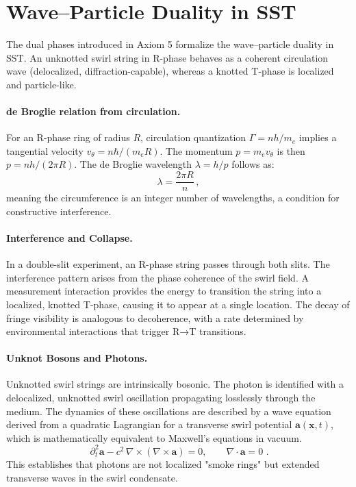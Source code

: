 \documentclass[11pt]{article}
\begin{document}
\section{Wave–Particle Duality in SST}
\label{sec:wave_particle_duality}
The dual phases introduced in Axiom 5 formalize the wave–particle duality in SST. An unknotted swirl string in R-phase behaves as a coherent circulation wave (delocalized, diffraction-capable), whereas a knotted T-phase is localized and particle-like.

\paragraph{de Broglie relation from circulation.}
    For an R-phase ring of radius $R$, circulation quantization $\Gamma = n h/m_e$ implies a tangential velocity $v_\theta = n \hbar/(m_e R)$. The momentum $p = m_e v_\theta$ is then $p = n h / (2\pi R)$. The de Broglie wavelength $\lambda = h/p$ follows as:
    \[ \lambda = \frac{2\pi R}{n}\,, \]
    meaning the circumference is an integer number of wavelengths, a condition for constructive interference.

\paragraph{Interference and Collapse.}
    In a double-slit experiment, an R-phase string passes through both slits. The interference pattern arises from the phase coherence of the swirl field. A measurement interaction provides the energy to transition the string into a localized, knotted T-phase, causing it to appear at a single location. The decay of fringe visibility is analogous to decoherence, with a rate determined by environmental interactions that trigger R→T transitions.

\paragraph{Unknot Bosons and Photons.}
    Unknotted swirl strings are intrinsically bosonic. The photon is identified with a delocalized, unknotted swirl oscillation propagating losslessly through the medium. The dynamics of these oscillations are described by a wave equation derived from a quadratic Lagrangian for a transverse swirl potential $\mathbf{a}(\mathbf{x}, t)$, which is mathematically equivalent to Maxwell's equations in vacuum.
    \[ \boxed{\,\partial_t^2 \mathbf{a} - c^2\,\nabla\times(\nabla\times \mathbf{a}) = 0, \qquad \nabla\cdot \mathbf{a}=0\,}\,. \]
    This establishes that photons are not localized "smoke rings" but extended transverse waves in the swirl condensate.
\end{document}
